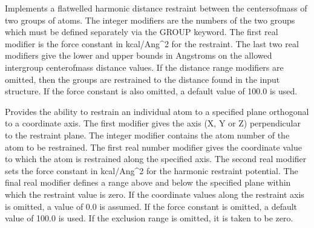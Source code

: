 \documentclass[letterpaper,11pt,english]{sphinxmanual}
\begin{document}
\ignorespaces {}\label{\detokenize{text/keywords:key-restrain-groups}}\begin{description}
\sphinxAtStartPar
Implements a flat\sphinxhyphen{}welled harmonic distance restraint between the centers\sphinxhyphen{}of\sphinxhyphen{}mass of two groups of atoms. The integer modifiers are the numbers of the two groups which must be defined separately via the GROUP keyword. The first real modifier is the force constant in kcal/Ang\textasciicircum{}2 for the restraint. The last two real modifiers give the lower and upper bounds in Angstroms on the allowed intergroup center\sphinxhyphen{}of\sphinxhyphen{}mass distance values. If the distance range modifiers are omitted, then the groups are restrained to the distance found in the input structure. If the force constant is also omitted, a default value of 100.0 is used.

\end{description}

\ignorespaces {}\label{\detokenize{text/keywords:key-restrain-plane}}\begin{description}
\sphinxAtStartPar
Provides the ability to restrain an individual atom to a specified plane orthogonal to a coordinate axis. The first modifier gives the axis (X, Y or Z) perpendicular to the restraint plane. The integer modifier contains the atom number of the atom to be restrained. The first real number modifier gives the coordinate value to which the atom is restrained along the specified axis. The second real modifier sets the force constant in kcal/Ang\textasciicircum{}2 for the harmonic restraint potential. The final real modifier defines a range above and below the specified plane within which the restraint value is zero. If the coordinate values along the restraint axis is omitted, a value of 0.0 is assumed. If the force constant is omitted, a default value of 100.0 is used. If the exclusion range is omitted, it is taken to be zero.

\end{description}
\end{document}
